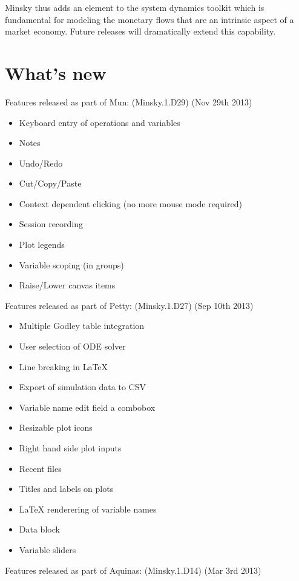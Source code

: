 Minsky thus adds an element to the system dynamics toolkit which is
fundamental for modeling the monetary flows that are an intrinsic
aspect of a market economy. Future releases will dramatically extend
this capability. 


\section{What's new}

Features released as part of Mun: (Minsky.1.D29) (Nov 29th 2013)

\begin{itemize}
\item Keyboard entry of operations and variables
\item Notes
\item Undo/Redo
\item Cut/Copy/Paste
\item Context dependent clicking (no more mouse mode required)
\item Session recording
\item Plot legends
\item Variable scoping (in groups)
\item Raise/Lower canvas items
\end{itemize}

Features released as part of Petty: (Minsky.1.D27) (Sep 10th 2013)

\begin{itemize}
\item Multiple Godley table integration
\item User selection of ODE solver
\item Line breaking in LaTeX
\item Export of simulation data to CSV
\item Variable name edit field a combobox
\item Resizable plot icons
\item Right hand side plot inputs
\item Recent files
\item Titles and labels on plots
\item LaTeX renderering of variable names
\item Data block
\item Variable sliders
\end{itemize}

Features released as part of Aquinas: (Minsky.1.D14) (Mar 3rd 2013)

